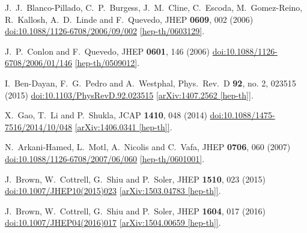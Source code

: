 \documentclass[11pt]{article}
\begin{document}
\begin{thebibliography}{99}
  J.~J.~Blanco-Pillado, C.~P.~Burgess, J.~M.~Cline, C.~Escoda, M.~Gomez-Reino, R.~Kallosh, A.~D.~Linde and F.~Quevedo,
  JHEP {\bf 0609}, 002 (2006)
  \href{https://dx.doi.org/10.1088/1126-6708/2006/09/002}{doi:10.1088/1126-6708/2006/09/002}
  \href{https://arxiv.org/abs/hep-th/0603129}{[hep-th/0603129]}.

  J.~P.~Conlon and F.~Quevedo,
  JHEP {\bf 0601}, 146 (2006)
  \href{https://dx.doi.org/10.1088/1126-6708/2006/01/146}{doi:10.1088/1126-6708/2006/01/146}
  \href{https://arxiv.org/abs/hep-th/0509012}{[hep-th/0509012]}.

  I.~Ben-Dayan, F.~G.~Pedro and A.~Westphal,
  Phys.\ Rev.\ D {\bf 92}, no. 2, 023515 (2015)
  \href{https://dx.doi.org/10.1103/PhysRevD.92.023515}{doi:10.1103/PhysRevD.92.023515}
  \href{https://arxiv.org/abs/1407.2562}{[arXiv:1407.2562 [hep-th]]}.

  X.~Gao, T.~Li and P.~Shukla,
  JCAP {\bf 1410}, 048 (2014)
  \href{https://dx.doi.org/10.1088/1475-7516/2014/10/048}{doi:10.1088/1475-7516/2014/10/048}
  \href{https://arxiv.org/abs/1406.0341}{[arXiv:1406.0341 [hep-th]]}.

  N.~Arkani-Hamed, L.~Motl, A.~Nicolis and C.~Vafa,
  JHEP {\bf 0706}, 060 (2007)
  \href{https://dx.doi.org/10.1088/1126-6708/2007/06/060}{doi:10.1088/1126-6708/2007/06/060}
  \href{https://arxiv.org/abs/hep-th/0601001}{[hep-th/0601001]}.

  J.~Brown, W.~Cottrell, G.~Shiu and P.~Soler,
  JHEP {\bf 1510}, 023 (2015)
  \href{https://dx.doi.org/10.1007/JHEP10(2015)023}{doi:10.1007/JHEP10(2015)023}
  \href{https://arxiv.org/abs/1503.04783}{[arXiv:1503.04783 [hep-th]]}.

  J.~Brown, W.~Cottrell, G.~Shiu and P.~Soler,
  JHEP {\bf 1604}, 017 (2016)
  \href{https://dx.doi.org/10.1007/JHEP04(2016)017}{doi:10.1007/JHEP04(2016)017}
  \href{https://arxiv.org/abs/1504.00659}{[arXiv:1504.00659 [hep-th]]}.


\end{thebibliography}
\end{document}
